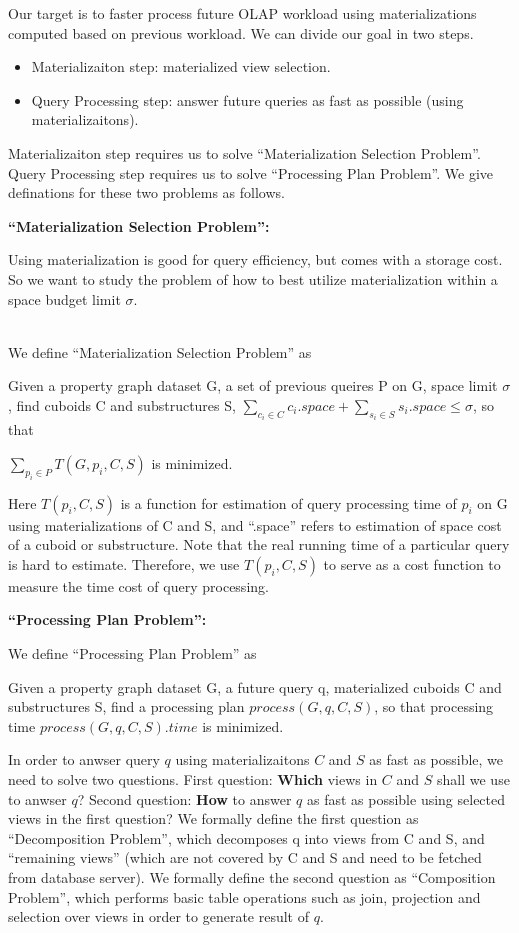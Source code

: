 Our target is to faster process future OLAP workload using materializations computed based on previous workload. We can divide our goal in two steps. 
\begin{itemize}
	\item Materializaiton step: materialized view selection. 
	\item Query Processing step: answer future queries as fast as possible (using materializaitons). 
\end{itemize} 

Materializaiton step requires us to solve ``Materialization Selection Problem''. Query Processing step requires us to solve ``Processing Plan Problem''. We give definations for these two problems as follows.

\textbf{``Materialization Selection Problem'':}

Using materialization is good for query efficiency, but comes with a storage cost. So we want to study the problem of how to best utilize materialization within a space budget limit $\sigma$. 


\\
We define ``Materialization Selection Problem'' as

Given a property graph dataset G, a set of previous queires P on G, space limit $\sigma$, find cuboids C and substructures S, $\displaystyle{\sum_{c_{i}\in C}c_{i}.space} + 
\displaystyle{\sum_{s_{i}\in S}s_{i}.space} 
\leq \sigma
$, so that 

$\displaystyle{\sum_{p_{i}\in P}T(G, p_{i}, C, S)}$  is minimized. 

Here $T(p_{i}, C, S)$ is a function for estimation of query processing time of $p_{i}$ on G using materializations of C and S, and ``.space'' refers to estimation of space cost of a cuboid or substructure. Note that the real running time of a particular query is hard to estimate. Therefore, we use $T(p_{i}, C, S)$ to serve as a cost function to measure the time cost of query processing. 

 
\textbf{``Processing Plan Problem'':}

We define ``Processing Plan Problem'' as


Given a property graph dataset G, a future query q, materialized cuboids C and substructures S, find a processing plan $process(G, q, C, S)$, so that processing time $process(G, q, C, S).time$ is minimized. 

In order to anwser query $q$ using materializaitons $C$ and $S$ as fast as possible, we need to solve two questions. First question: \textbf{Which} views in $C$ and $S$ shall we use to anwser $q$? Second question: \textbf{How} to answer $q$ as fast as possible using selected views in the first question? We formally define the first question as  ``Decomposition Problem'', which decomposes q into views from C and S, and ``remaining views'' (which are not covered by C and S and need to be fetched from database server). We formally define the second question as ``Composition Problem'', which performs basic table operations such as join, projection and selection over views in order to generate result of $q$. 

